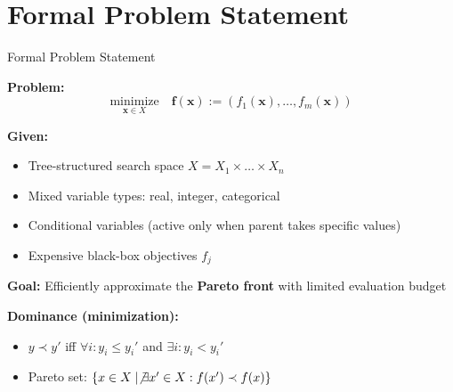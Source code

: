 \documentclass[aspectratio=169, 12pt]{beamer}
\begin{document}
\section{Formal Problem Statement}
\begin{frame}{Formal Problem Statement}

\textbf{Problem:}
\[
\underset{\mathbf{x} \in X}{\mathrm{minimize}} \quad \mathbf{f}(\mathbf{x}) := (f_1(\mathbf{x}), \ldots, f_m(\mathbf{x}))
\]

\vspace{0.2cm}

\textbf{Given:}
\begin{itemize}
    \item Tree-structured search space \(X = X_1 \times \ldots \times X_n\)
    \item Mixed variable types: real, integer, categorical
    \item Conditional variables (active only when parent takes specific values)
    \item Expensive black-box objectives \(f_j\)
\end{itemize}

\vspace{0.3cm}

\textbf{Goal:} Efficiently approximate the \textbf{Pareto front} with limited evaluation budget

\vspace{0.3cm}

\textbf{Dominance (minimization):}
\begin{itemize}
    \item \(y \prec y'\) iff \(\forall i: y_i \leq y_i'\) and \(\exists i: y_i < y_i'\)
    \item Pareto set: \(\{x \in X \mid \not\exists x' \in X: f(x') \prec f(x)\}\)
\end{itemize}

\end{frame}
\end{document}
